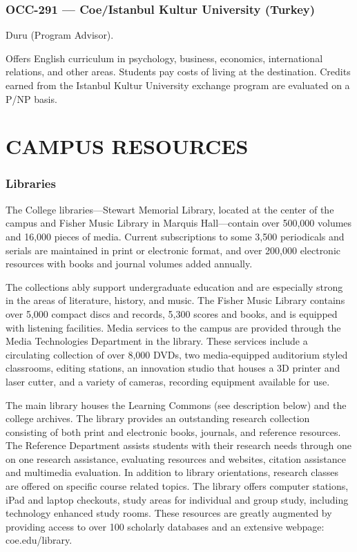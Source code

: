 \documentclass[
  letterpaper,
]{scrbook}
\renewcommand{\part}[1]{\addcontentsline{toc}{part}{#1}}
\begin{document}
\subsection{OCC-291 --- Coe/Istanbul Kultur University
(Turkey)}\label{occ-291-coeistanbul-kultur-university-turkey}

Duru (Program Advisor).

Offers English curriculum in psychology, business, economics,
international relations, and other areas. Students pay costs of living
at the destination. Credits earned from the Istanbul Kultur University
exchange program are evaluated on a P/NP basis.

\part{CAMPUS RESOURCES}

\chapter{CAMPUS RESOURCES}\label{campus-resources-1}

\subsection{Libraries}\label{libraries}

The College libraries---Stewart Memorial Library, located at the center
of the campus and Fisher Music Library in Marquis Hall---contain over
500,000 volumes and 16,000 pieces of media. Current subscriptions to
some 3,500 periodicals and serials are maintained in print or electronic
format, and over 200,000 electronic resources with books and journal
volumes added annually.

The collections ably support undergraduate education and are especially
strong in the areas of literature, history, and music. The Fisher Music
Library contains over 5,000 compact discs and records, 5,300 scores and
books, and is equipped with listening facilities. Media services to the
campus are provided through the Media Technologies Department in the
library. These services include a circulating collection of over 8,000
DVDs, two media-equipped auditorium styled classrooms, editing stations,
an innovation studio that houses a 3D printer and laser cutter, and a
variety of cameras, recording equipment available for use.

The main library houses the Learning Commons (see description below) and
the college archives. The library provides an outstanding research
collection consisting of both print and electronic books, journals, and
reference resources. The Reference Department assists students with
their research needs through one on one research assistance, evaluating
resources and websites, citation assistance and multimedia evaluation.
In addition to library orientations, research classes are offered on
specific course related topics. The library offers computer stations,
iPad and laptop checkouts, study areas for individual and group study,
including technology enhanced study rooms. These resources are greatly
augmented by providing access to over 100 scholarly databases and an
extensive webpage: coe.edu/library.
\end{document}
